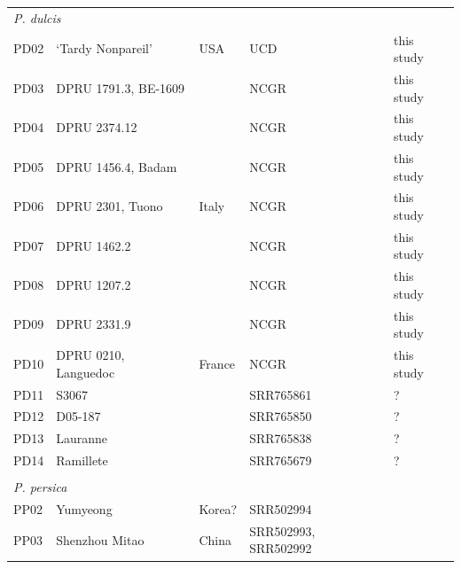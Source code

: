 \documentclass[12pt]{article}
\begin{document}
\begin{center}
\begin{longtable}{lllll}
                 \multicolumn{5}{l}{\emph{P. dulcis}}  \\
                 PD02 &‘Tardy Nonpareil’ &USA &UCD &this study\\ %
                 PD03 &DPRU 1791.3, BE-1609 & &NCGR &this study\\ %
                 PD04 &DPRU 2374.12 & &NCGR &this study\\ %
                 PD05 &DPRU 1456.4, Badam & &NCGR &this study\\ %
                 PD06 &DPRU 2301, Tuono &Italy &NCGR &this study\\ %
                 PD07 &DPRU 1462.2 & &NCGR &this study\\ %
                 PD08 &DPRU 1207.2 & &NCGR &this study\\ %
                 PD09 &DPRU 2331.9 & &NCGR &this study\\ %
                 PD10 &DPRU 0210, Languedoc &France &NCGR &this study\\ %
                 PD11 &S3067 & &SRR765861 &\citealt{koepke2013comparative}?\\
                 PD12 &D05-187 & &SRR765850 &\citealt{koepke2013comparative}?\\
                 PD13 &Lauranne & &SRR765838 &\citealt{koepke2013comparative}?\\
                 PD14 &Ramillete & &SRR765679 &\citealt{koepke2013comparative}?\\
                 \\
                 \multicolumn{5}{l}{\emph{P. persica}}  \\ %
                 PP02 &Yumyeong &Korea? &SRR502994 &\citealt{verde2013high}\\
                 PP03 &Shenzhou Mitao&China &\multirow{2}{1cm}{SRR502993, SRR502992} &\citealt{verde2013high}\\

\end{longtable}
\end{center}
\end{document}
